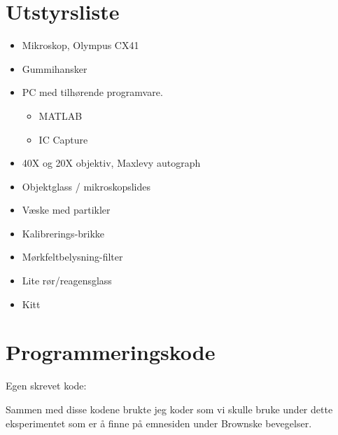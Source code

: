 \documentclass[norsk,a4paper,12pt]{article}
\begin{document}
\newpage
\begin{appendices}
\appendix
\section{Utstyrsliste}
\begin{multicols}{2}
\begin{itemize}
  	\item Mikroskop, Olympus CX41
	\item Gummihansker
	\item PC med tilhørende programvare.
		\begin{itemize}
		\item MATLAB \item IC Capture
		\end{itemize}
	\item 40X og 20X objektiv, Maxlevy autograph
	\item Objektglass / mikroskopslides
	\item Væske med partikler
	\item Kalibrerings-brikke
	\item Mørkfeltbelysning-filter
	\item Lite rør/reagensglass
	\item Kitt
\end{itemize}
\end{multicols}

\section{Programmeringskode}
Egen skrevet kode:


Sammen med disse kodene brukte jeg koder som vi skulle bruke under dette eksperimentet som er å finne på emnesiden under Brownske bevegelser.


\end{appendices}
\end{document}
